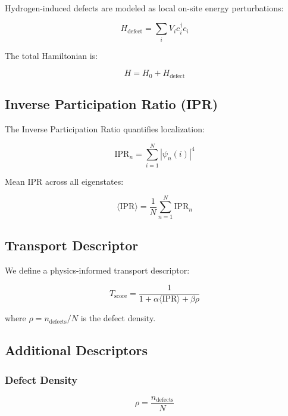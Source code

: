\documentclass[11pt,a4paper]{article}
\begin{document}
Hydrogen-induced defects are modeled as local on-site energy perturbations:

\begin{equation}
H_{\text{defect}} = \sum_i V_i c_i^\dagger c_i
\end{equation}

The total Hamiltonian is:

\begin{equation}
H = H_0 + H_{\text{defect}}
\end{equation}

\subsection{Inverse Participation Ratio (IPR)}

The Inverse Participation Ratio quantifies localization:

\begin{equation}
\text{IPR}_n = \sum_{i=1}^{N} |\psi_n(i)|^4
\end{equation}

Mean IPR across all eigenstates:

\begin{equation}
\langle \text{IPR} \rangle = \frac{1}{N} \sum_{n=1}^{N} \text{IPR}_n
\end{equation}

\subsection{Transport Descriptor}

We define a physics-informed transport descriptor:

\begin{equation}
T_{\text{score}} = \frac{1}{1 + \alpha \langle \text{IPR} \rangle + \beta \rho}
\end{equation}

where $\rho = n_{\text{defects}} / N$ is the defect density.

\subsection{Additional Descriptors}

\subsubsection{Defect Density}
\begin{equation}
\rho = \frac{n_{\text{defects}}}{N}
\end{equation}
\end{document}
